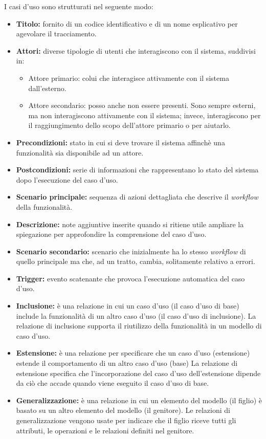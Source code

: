 \noindent
I casi d'uso sono strutturati nel seguente modo:
\begin{itemize}
	\item \textbf{Titolo:} fornito di un codice identificativo e di un nome esplicativo per agevolare il tracciamento.
	\item \textbf{Attori:} diverse tipologie di utenti che interagiscono con il sistema, suddivisi in:
	\begin{itemize}
		\item Attore primario: colui che interagisce attivamente con il sistema dall'esterno.
		\item Attore secondario: posso anche non essere presenti. 
		Sono sempre esterni, ma non interagiscono attivamente con il sistema; invece, interagiscono per il raggiungimento dello scopo dell'attore primario o per aiutarlo.
	\end{itemize}
	\item \textbf{Precondizioni:} stato in cui si deve trovare il sistema affinchè una funzionalità sia disponibile ad un attore.
	\item \textbf{Postcondizioni:} serie di informazioni che rappresentano lo stato del sistema dopo l'esecuzione del caso d'uso.
	\item \textbf{Scenario principale:} sequenza di azioni dettagliata che descrive il \textit{workflow} della funzionalità.
	\item \textbf{Descrizione:} note aggiuntive inserite quando si ritiene utile ampliare la spiegazione per approfondire la comprensione del caso d'uso.
	\item \textbf{Scenario secondario:} scenario che inizialmente ha lo stesso \textit{workflow} di quello principale ma che, ad un tratto, cambia, solitamente relativo a errori.
	\item \textbf{Trigger:} evento scatenante che provoca l'esecuzione automatica del caso d'uso.
	\item \textbf{Inclusione:} è una relazione in cui un caso d'uso (il caso d'uso di base) include la funzionalità di un altro caso d'uso (il caso d'uso di inclusione). 
		La relazione di inclusione supporta il riutilizzo della funzionalità in un modello di caso d'uso.
	\item \textbf{Estensione:} è una relazione per specificare che un caso d'uso (estensione) estende il comportamento di un altro caso d'uso (base)
	La relazione di estensione specifica che l'incorporazione del caso d'uso dell'estensione dipende da ciò che accade quando viene eseguito il caso d'uso di base.
	\item \textbf{Generalizzazione:} è una relazione in cui un elemento del modello (il figlio) è basato su un altro elemento del modello (il genitore). 
		Le relazioni di generalizzazione vengono usate per indicare che il figlio riceve tutti gli attributi, le operazioni e le relazioni definiti nel genitore.
\end{itemize}

